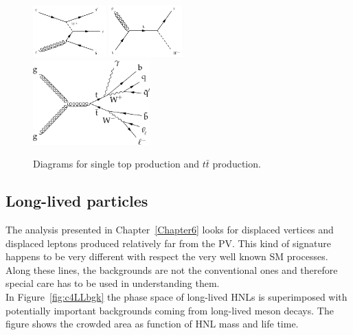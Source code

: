 \begin{figure}[h!]
\centering
 \includegraphics[width=0.25\textwidth]{Figures/c4/dia/60100003.pdf}
  \includegraphics[width=0.25\textwidth]{Figures/c4/dia/60100001.pdf}\\
  \includegraphics[width=0.4\textwidth]{Figures/c4/dia/Figure_001-a_tt.png} 
  \caption{Diagrams for single top production and $t\bar{t}$ production.~\cite{diagram}}
  \label{fig:c46}
\end{figure}


\subsection{Long-lived particles}\label{sec:c4LLbgk}
The analysis presented in Chapter~\ref{Chapter6} looks for displaced
vertices and displaced leptons produced relatively far from the PV.
This kind of signature happens to be very different with respect the
very well known SM processes. Along these lines, the backgrounds
are not the conventional ones and
therefore special care has to be used in understanding them.\\
In Figure~\ref{fig:c4LLbgk} the phase space of long-lived HNLs is
superimposed with potentially important backgrounds coming from
long-lived meson decays. The figure shows the crowded area as function
of HNL mass and life time.

